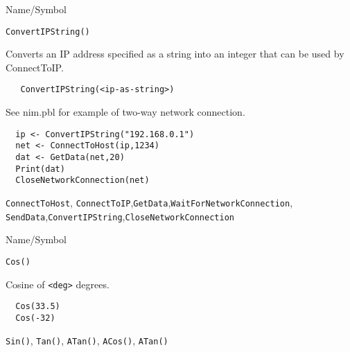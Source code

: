 \rl



\begin{desc}{Name/Symbol}
\item[Name/Symbol] \verb+ConvertIPString()+

\item[Description]	Converts an IP address specified as a string into
  an integer that can be used by ConnectToIP.

\item[Usage]
\begin{verbatim}
   ConvertIPString(<ip-as-string>)
\end{verbatim}

\item[Example]	

  See nim.pbl for example of two-way network connection.
\begin{verbatim}
  ip <- ConvertIPString("192.168.0.1")
  net <- ConnectToHost(ip,1234)
  dat <- GetData(net,20)
  Print(dat)
  CloseNetworkConnection(net)
\end{verbatim}

\item[See Also]
  \verb+ConnectToHost+, \verb+ConnectToIP+,\verb+GetData+,\verb+WaitForNetworkConnection+,
   \verb+SendData+,\verb+ConvertIPString+,\verb+CloseNetworkConnection+
\end{desc}

\rl


\begin{desc}{Name/Symbol}
\item[Name/Symbol]  	\verb+Cos()+
			 
\item[Description] 	Cosine of \verb+<deg>+ degrees.

\item[Usage]		
\item[Example]	
\begin{verbatim}
  Cos(33.5)
  Cos(-32)
\end{verbatim}

\item[See Also]     	\verb+Sin()+, \verb+Tan()+, \verb+ATan()+, \verb+ACos()+, \verb+ATan()+
\end{desc}

\rl     


